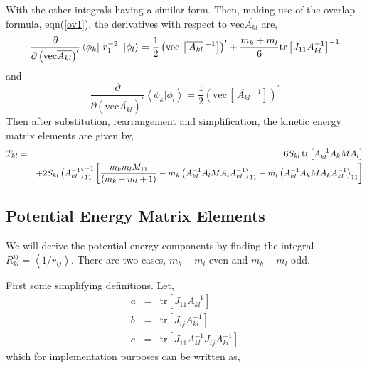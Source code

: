 \documentclass[12pt,doublespace]{article}
\begin{document}
With the other integrals having a similar form. Then, making use of the
overlap formula, eqn(\ref{ov1}), the derivatives with respect to $\mathrm{vec%
}\overline{A_{kl}}$ are, 
\begin{equation}
\frac{\partial }{\partial \left( \mathrm{vec}\overline{A_{kl}}\right)
^{\prime }}\left\langle \phi _{k}\right| \,r_{1}^{-2}\,\mathbf{\,}\left|
\phi _{l}\right\rangle =\frac{1}{2}\left( \mathrm{vec}\,\left[ \overline{%
\,A_{kl}}\,^{-1}\right] \right) ^{\prime }+\frac{m_{k}+m_{l}}{6}\mathrm{tr}%
\left[ J_{11}A_{kl}^{-1}\right] ^{-1}
\end{equation}
and 
\begin{equation}
\frac{\partial }{\partial \left( \mathrm{vec}\overline{A_{kl}}\right)
^{\prime }}\left\langle \phi _{k}\right. |\left. \phi _{l}\right\rangle =%
\frac{1}{2}\left( \mathrm{vec}\,\left[ \overline{\,A_{kl}}\,^{-1}\right]
\right) ^{\prime }
\end{equation}
Then after substitution, rearrangement and simplification, the kinetic
energy matrix elements are given by, 
\begin{eqnarray}
T_{kl} &=&6S_{kl}\,\mathrm{tr}\left[ A_{kl}^{-1}A_{k}MA_{l}\right]
\label{Tkl} \\
&&+2S_{kl}\left( A_{kl}^{-1}\right) _{11}^{-1}\left[ \frac{m_{k}m_{l}M_{11}}{%
\left( m_{k}+m_{l}+1\right) }-m_{k}\left(
A_{kl}^{-1}A_{l}MA_{l}A_{kl}^{-1}\right) _{11}-m_{l}\left(
A_{kl}^{-1}A_{k}MA_{k}A_{kl}^{-1}\right) _{11}\right]
\end{eqnarray}

\subsection{Potential Energy Matrix Elements}

We will derive the potential energy components by finding the integral $%
R_{kl}^{ij}=\left\langle 1/r_{ij}\right\rangle .$ There are two cases, $%
m_{k}+m_{l}$ even and $m_{k}+m_{l}$ odd.

First some simplifying definitions. Let, 
\begin{eqnarray}
a &=&\mathrm{tr}\left[ J_{11}A_{kl}^{-1}\right]  \label{adef} \\
b &=&\mathrm{tr}\left[ J_{ij}A_{kl}^{-1}\right]  \label{bdef} \\
c &=&\mathrm{tr}\left[ J_{11}A_{kl}^{-1}J_{ij}A_{kl}^{-1}\right]
\label{cdef}
\end{eqnarray}
which for implementation purposes can be written as,
\end{document}
